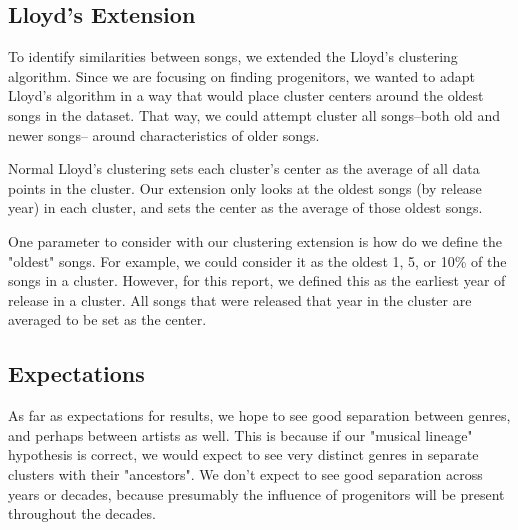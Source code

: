 \subsection{Lloyd's Extension}

To identify similarities between songs, we extended the Lloyd's clustering algorithm.
Since we are focusing on finding progenitors, we wanted to adapt Lloyd's algorithm
in a way that would place cluster centers around the oldest songs in the dataset.
That way, we could attempt cluster all songs--both old and newer songs--
around characteristics of older songs.

Normal Lloyd's clustering sets each cluster's center as the average of all data points in the cluster.
Our extension only looks at the oldest songs (by release year) in each cluster,
and sets the center as the average of those oldest songs.

One parameter to consider with our clustering extension is how do we define the "oldest" songs.
For example, we could consider it as the oldest 1, 5, or 10\% of the songs in a cluster.
However, for this report, we defined this as the earliest year of release in a cluster.
All songs that were released that year in the cluster are averaged to be set as the center.

\subsection{Expectations}

As far as expectations for results, we hope to see good separation between genres, and perhaps between artists as well.
This is because if our "musical lineage" hypothesis is correct,
we would expect to see very distinct genres in separate clusters with their "ancestors".
We don't expect to see good separation across years or decades,
because presumably the influence of progenitors will be present throughout the decades.

